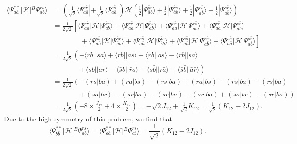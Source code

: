 \documentclass[a4paper]{book}
\newcounter{solution}[chapter]
\begin{document}
\begin{solution}
\begin{align*}
		\langle \Psi^{**}_{a\bar{a}} | \mathscr{H} | {}^B \Psi^{rs}_{ab} \rangle &= \left( \frac{1}{ \sqrt{2} } \langle \Psi^{r \bar{r}}_{a \bar{a}} | + \frac{1}{ \sqrt{2} } \langle \Psi^{s \bar{s}}_{a \bar{a}} | \right) \mathscr{H} \left( \frac{1}{2} | \Psi^{\bar{s} r }_{\bar{a} b} \rangle + \frac{1}{2} | \Psi^{\bar{r} s }_{\bar{a} b} \rangle + \frac{1}{2} | \Psi^{ r \bar{s}}_{a \bar{b}} \rangle + \frac{1}{2} | \Psi^{s \bar{r}}_{a\bar{b}} \rangle \right) \\
		&= \frac{1}{ 2\sqrt{2} } \left[ \langle \Psi^{r \bar{r}}_{a\bar{a}} | \mathscr{H} | \Psi^{\bar{s} r }_{\bar{a} b} \rangle + \langle \Psi^{r \bar{r}}_{a\bar{a}} | \mathscr{H} | \Psi^{\bar{r} s }_{\bar{a} b} \rangle + \langle \Psi^{r \bar{r}}_{a\bar{a}} | \mathscr{H} | \Psi^{ r \bar{s}}_{a \bar{b}} \rangle + \langle \Psi^{r \bar{r}}_{a\bar{a}} | \mathscr{H} | \Psi^{s \bar{r}}_{a\bar{b}} \rangle \right. \\
		&\hspace{4em} + \left. \langle \Psi^{s \bar{s}}_{a\bar{a}} | \mathscr{H} | \Psi^{\bar{s} r }_{\bar{a} b} \rangle + \langle \Psi^{s \bar{s}}_{a\bar{a}} | \mathscr{H} | \Psi^{\bar{r} s }_{\bar{a} b} \rangle + \langle \Psi^{s \bar{s}}_{a\bar{a}} | \mathscr{H} | \Psi^{ r \bar{s}}_{a \bar{b}} \rangle + \langle \Psi^{s \bar{s}}_{a\bar{a}} | \mathscr{H} | \Psi^{s \bar{r}}_{a\bar{b}} \rangle \right] \\
		&= \frac{1}{ 2\sqrt{2} } \left( - \langle \bar{r} b || \bar{s} a \rangle + \langle r b || a s \rangle + \langle \bar{r} \bar{b} || \bar{a} \bar{s} \rangle - \langle r \bar{b} || s \bar{a} \rangle \right. \\
		&\hspace{4em} \left. + \langle s b || a r \rangle - \langle \bar{s} b || \bar{r} a \rangle - \langle s \bar{b} || r \bar{a} \rangle + \langle \bar{s} \bar{b} || \bar{a} \bar{r} \rangle \right) \\
		&= \frac{1}{ 2\sqrt{2} } \left( - (rs|ba) + (ra|bs) - (rs|ba) + (ra|bs) - (rs|ba) - (rs|ba) \right. \\
		&\hspace{4em} \left. + (sa|br) - (sr|ba) - (sr|ba) - (sr|ba) + (sa|br) - (sr|ba) \right) \\
		&= \frac{1}{ 2\sqrt{2} } \left( - 8 \times \frac{ J_{12} }{2} + 4 \times \frac{ K_{12} }{2} \right) = -\sqrt{2} J_{12} + \frac{1}{ \sqrt{2} } K_{12} = \frac{1}{ \sqrt{2} } \left( K_{12} - 2 J_{12} \right).
	\end{align*}
	Due to the high symmetry of this problem, we find that
	\[
		\langle \Psi^{**}_{b\bar{b}} | \mathscr{H} | {}^B \Psi^{rs}_{ab} \rangle = \langle \Psi^{**}_{a\bar{a}} | \mathscr{H} | {}^B \Psi^{rs}_{ab} \rangle = \frac{1}{ \sqrt{2} } \left( K_{12} - 2 J_{12} \right).
\]
\end{solution}
\end{document}
